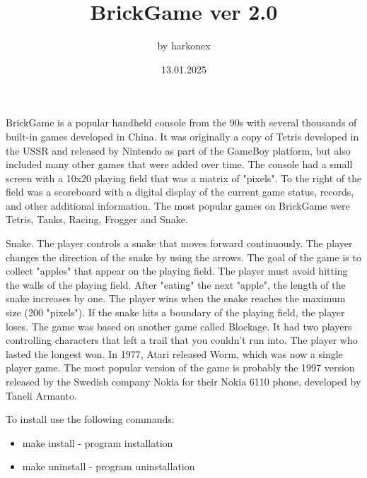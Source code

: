 \documentclass[10pt, oneside]{beamer}
\begin{document}
    \title{BrickGame ver 2.0}
    \author{by harkonex}
    \date{13.01.2025}
    \begin{frame}
        \titlepage
    \end{frame}


    \begin{frame}
        BrickGame is a popular handheld console from the 90s with several thousands of built-in games developed in China.
        It was originally a copy of Tetris developed in the USSR and released by Nintendo as part of the GameBoy
        platform, but also included many other games that were added over time. The console had a small screen with a
        10x20 playing field that was a matrix of "pixels". To the right of the field was a scoreboard with a digital
        display of the current game status, records, and other additional information. The most popular games on
        BrickGame were Tetris, Tanks, Racing, Frogger and Snake.
    \end{frame}

    \begin{frame}
        Snake.
        The player controls a snake that moves forward continuously. The player changes the direction of the snake by
        using the arrows. The goal of the game is to collect "apples" that appear on the playing field. The player must
        avoid hitting the walls of the playing field. After "eating" the next "apple", the length of the snake increases
        by one. The player wins when the snake reaches the maximum size (200 "pixels"). If the snake hits a boundary of
        the playing field, the player loses.
        The game was based on another game called Blockage. It had two players controlling characters that left a trail
        that you couldn't run into. The player who lasted the longest won. In 1977, Atari released Worm, which was now a
        single player game. The most popular version of the game is probably the 1997 version released by the Swedish
        company Nokia for their Nokia 6110 phone, developed by Taneli Armanto.
    \end{frame}

    \begin{frame}
        \color{blue} To install use the following commands:
        \begin{itemize}
            \item make install - program installation
            \item make uninstall - program uninstallation
        \end{itemize}
    \end{frame}
\end{document}
